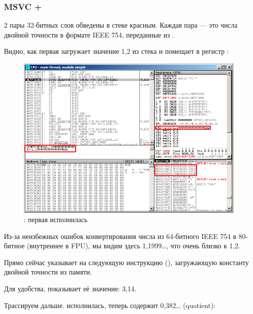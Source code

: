 ﻿\clearpage
\subsubsection{MSVC + \olly}
\myindex{\olly}

2 пары 32-битных слов обведены в стеке красным.
Каждая пара --- это числа двойной точности в формате IEEE 754, переданные из \main.

Видно, как первая \FLD загружает значение 1,2 из стека и помещает в регистр :

\begin{figure}[H]
\centering
\includegraphics[scale=\FigScale]{patterns/12_FPU/1_simple/olly1.png}
\caption{\olly: первая \FLD исполнилась}
\label{fig:FPU_simple_olly_1}
\end{figure}

Из-за неизбежных ошибок конвертирования числа из 64-битного IEEE 754 в 80-битное (внутреннее в FPU),
мы видим здесь 1,1999\ldots, что очень близко к 1,2.

Прямо сейчас \EIP указывает на следующую инструкцию (\FDIV), загружающую константу двойной точности 
из памяти.

Для удобства, \olly показывает её значение: 3,14.

\clearpage
Трассируем дальше. 
\FDIV исполнилась, теперь  содержит 0,382\ldots
(\gls{quotient}):

